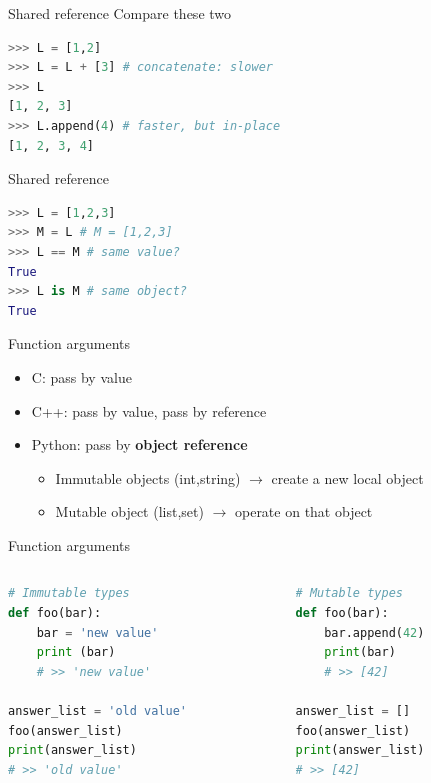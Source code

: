 \documentclass{../TexTemplate/myslide}
\begin{document}
\begin{frame}[fragile]{Shared reference}
Compare these two
\begin{lstlisting}[language=python]
>>> L = [1,2]
>>> L = L + [3] # concatenate: slower
>>> L
[1, 2, 3]
>>> L.append(4) # faster, but in-place
[1, 2, 3, 4]
\end{lstlisting}
\end{frame}

\begin{frame}[fragile]{Shared reference}
\begin{lstlisting}[language=python]
>>> L = [1,2,3]
>>> M = L # M = [1,2,3]
>>> L == M # same value?
True
>>> L is M # same object?
True
\end{lstlisting}
\end{frame}

\begin{frame}{Function arguments}
\begin{itemize}
	\item C: pass by value
	\item C++: pass by value, pass by reference
	\pause
	\item Python: pass by \textbf{object reference}
	\begin{itemize}
		\item Immutable objects (int,string) $\to$ create a new local object
		\item Mutable object (list,set) $\to$ operate on that object
	\end{itemize}
\end{itemize}
\end{frame}

\begin{frame}[fragile]{Function arguments}
\begin{columns}
\begin{column}{0.5\linewidth}
\begin{lstlisting}[language=python]
# Immutable types
def foo(bar):
    bar = 'new value'
    print (bar)
    # >> 'new value'

answer_list = 'old value'
foo(answer_list)
print(answer_list)
# >> 'old value'
\end{lstlisting}
\end{column}
\begin{column}{0.5\linewidth}
\begin{lstlisting}[language=python]
# Mutable types
def foo(bar):
    bar.append(42)
    print(bar)
    # >> [42]

answer_list = []
foo(answer_list)
print(answer_list)
# >> [42]
\end{lstlisting}
\end{column}
\end{columns}
\end{frame}
\end{document}
